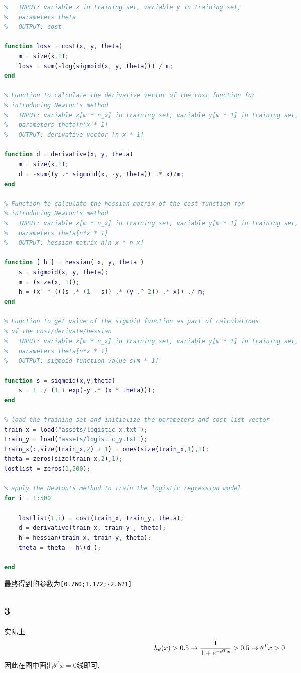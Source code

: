 \documentclass{ctexart}
\begin{document}
	\begin{lstlisting}[language = MATLAB]
% Function to calculate the cost in logistic regression
%   INPUT: variable x in training set, variable y in training set,
%   parameters theta
%   OUTPUT: cost

function loss = cost(x, y, theta)
	m = size(x,1);
	loss = sum(-log(sigmoid(x, y, theta))) / m;
end

% Function to calculate the derivative vector of the cost function for
% introducing Newton's method
%   INPUT: variable x[m * n_x] in training set, variable y[m * 1] in training set,
%   parameters theta[n*x * 1]
%   OUTPUT: derivative vector [n_x * 1]

function d = derivative(x, y, theta)
	m = size(x,1);
	d = -sum((y .* sigmoid(x, -y, theta)) .* x)/m;
end

% Function to calculate the hessian matrix of the cost function for
% introducing Newton's method
%   INPUT: variable x[m * n_x] in training set, variable y[m * 1] in training set,
%   parameters theta[n*x * 1]
%   OUTPUT: hessian matrix h[n_x * n_x]

function [ h ] = hessian( x, y, theta )
	s = sigmoid(x, y, theta);
	m = (size(x, 1));
	h = (x' * (((s .* (1 - s)) .* (y .^ 2)) .* x)) ./ m;
end

% Function to get value of the sigmoid function as part of calculations
% of the cost/derivate/hessian
%   INPUT: variable x[m * n_x] in training set, variable y[m * 1] in training set,
%   parameters theta[n*x * 1]
%   OUTPUT: sigmoid function value s[m * 1]

function s = sigmoid(x,y,theta)
	s = 1 ./ (1 + exp(-y .* (x * theta)));
end

% load the training set and initialize the parameters and cost list vector
train_x = load("assets/logistic_x.txt");
train_y = load("assets/logistic_y.txt");
train_x(:,size(train_x,2) + 1) = ones(size(train_x,1),1);
theta = zeros(size(train_x,2),1);
lostlist = zeros(1,500);

% apply the Newton's method to train the logistic regression model
for i = 1:500

	lostlist(1,i) = cost(train_x, train_y, theta);
	d = derivative(train_x, train_y , theta);
	h = hessian(train_x, train_y, theta);
	theta = theta - h\(d');    

end
	\end{lstlisting}
	
最终得到的参数为\verb|[0.760;1.172;-2.621]|

\subsection{3}
实际上
\begin{equation}
	h_\theta(x) > 0.5 \to \frac{1}{1 + e^{-\theta^Tx}} > 0.5 \to \theta^Tx > 0 \notag
\end{equation}
因此在图中画出$\theta^Tx = 0$线即可.
\end{document}

